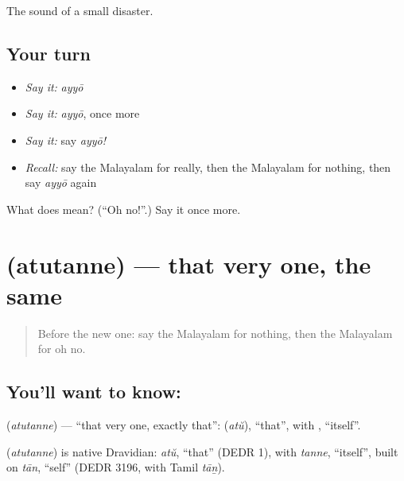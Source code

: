 \begin{grammarlens}[title={What you've built}]
The sound of a small disaster.
\end{grammarlens}

\subsection*{Your turn}
\begin{itemize}
\raggedright
  \item \emph{Say it:} \emph{ayyō}
  \item \emph{Say it:} \emph{ayyō}, once more
  \item \emph{Say it:} say \emph{ayyō!}
  \item \emph{Recall:} say the Malayalam for really, then the Malayalam for nothing, then say \emph{ayyō} again
\end{itemize}

\begin{tcolorbox}[breakable,colback=teal!4,colframe=teal!35!black,title={Before you move on}]
What does  mean? (\textquotedblleft{}Oh no!\textquotedblright{}.) Say it once more.
\end{tcolorbox}
\section[\texorpdfstring{\ml{അതുതന്നെ} (atutanne)}{അതുതന്നെ (atutanne)}]{ (atutanne) — that very one, the same}

\label{lesson:ML-C122-thesame}



\begin{quote}
Before the new one: say the Malayalam for nothing, then the Malayalam for oh no.
\end{quote}

\subsection*{You'll want to know: }
\textbf{} (\emph{atutanne}) — \textquotedblleft{}that very one, exactly that\textquotedblright{}: \textbf{} (\emph{atŭ}), \textquotedblleft{}that\textquotedblright{}, with \textbf{}, \textquotedblleft{}itself\textquotedblright{}.

\begin{cousinweb}
\textbf{} (\emph{atutanne}) is native Dravidian: \emph{atŭ}, \textquotedblleft{}that\textquotedblright{} (DEDR 1), with \emph{tanne}, \textquotedblleft{}itself\textquotedblright{}, built on \emph{tān}, \textquotedblleft{}self\textquotedblright{} (DEDR 3196, with Tamil \emph{tāṉ}).
\end{cousinweb}

